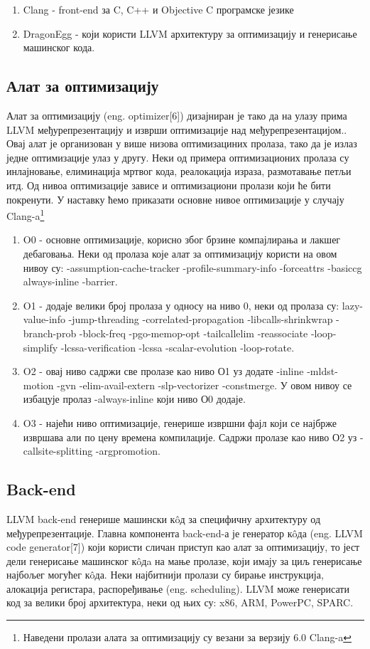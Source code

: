 \documentclass[12pt,oneside]{memoir}
\begin{document}
 \begin{enumerate}
 \item Clang - front-end за  C, C++ и Objective C програмске језике
 \item DragonEgg -  који користи LLVM архитектуру за оптимизацију  
 				 и генерисање машинског кода.
 \end{enumerate}

 \subsection{Алат за оптимизацију}
 Алат за оптимизацију (eng. optimizer[6]) дизајниран је тако да на улазу прима LLVM
 међурепрезентацију и изврши оптимизације над међурепрезентацијом..
 Овај алат је организован у више низова оптимизациних пролаза, тако да је излаз
 једне оптимизације улаз у другу.
 Неки од примера оптимизационих пролаза су инлајновање, елиминација мртвог кода,
 реалокација израза, размотавање петљи итд. 
 Од нивоа оптимизације зависе и оптимизациони пролази који ће бити покренути.
 У наставку ћемо приказати основне нивое оптимизације у случају Clang-a\footnote{Наведени пролази алата за оптимизацију су везани за верзију 6.0 Clang-a}
 \begin{enumerate}
 \item O0 -  основне оптимизације, корисно због брзине компајлирања и лакшег
 			дебаговања.
 			Неки од пролаза које алат за оптимизацију користи на овом нивоу су:
 			-assumption-cache-tracker -profile-summary-info -forceattrs -basiccg 		                                   always-inline -barrier.
 \item O1 - додаје велики број пролаза у односу на ниво 0, неки од пролаза су:
           lazy-value-info -jump-threading -correlated-propagation -libcalls-shrinkwrap -branch-prob -block-freq -pgo-memop-opt -tailcallelim -reassociate -loop-simplify -lcssa-verification -lcssa -scalar-evolution -loop-rotate. 
           
 \item O2 - овај ниво садржи све пролазе као ниво О1 уз додате -inline -mldst-motion -gvn -elim-avail-extern -slp-vectorizer -constmerge. У овом нивоу се избацује пролаз
 	-always-inline који ниво О0 додаје.
 \item O3 - најећи ниво оптимизације, генерише извршни фајл који се најбрже извршава
 	али по цену времена компилације. Садржи пролазе као ниво О2 уз -callsite-splitting -argpromotion.
 \end{enumerate}

\subsection{Back-end} 
LLVM back-end генерише машински к\^{o}д за специфичну архитектуру од међурепрезентације. 
Главна компонента back-end-а је генератор к\^{o}да (eng. LLVM code generator[7]) који
користи сличан приступ као алат за оптимизацију, то јест дели генерисање машинског
к\^{o}дa на мање пролазе, који имају за циљ генерисање најбољег могућег к\^{o}да.
Неки најбитнији пролази су бирање инструкција, алокација регистара, распоређивање
(eng. scheduling).
LLVM може генерисати код за велики број архитектура, неки од њих су: x86, ARM,
PowerPC, SPARC.
\end{document}
